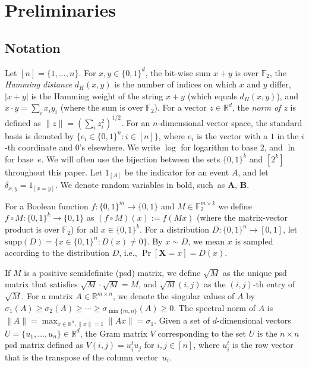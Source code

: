 \documentclass[twoside,11pt]{article}
\newcommand{\F}{\ensuremath{\mathbb{F}}}
\newcommand{\supp}{\mathrm{supp}}
\newcommand{\R}{\ensuremath{\mathbb{R}}}
\def\01{\{0,1\}}
\begin{document}
\section{Preliminaries}
\label{section:preliminaries}

\subsection{Notation}
Let $[n]=\{1,\ldots,n\}$. For $x,y\in \01^d$, the bit-wise sum $x+ y$ is over $\F_2$, the \emph{Hamming distance} $d_H(x,y)$ is the number of indices on which $x$ and $y$ differ, $|x+y|$ is the Hamming weight of the string $x+y$ (which equals $d_H(x,y)$), and $x\cdot y=\sum_i x_iy_i$ (where the sum is over $\F_2$). For a vector $z\in \R^d$,  the \emph{norm of $z$} is defined as $\|z\|=(\sum_i z_i^2)^{1/2}$. For an $n$-dimensional vector space, the standard basis is denoted by $\{e_i\in \01^n:i\in [n]\}$, where $e_i$ is the vector with a $1$ in the $i$-th coordinate and $0$'s elsewhere. We write $\log$ for logarithm to base $2$, and $\ln$ for base~$e$. We will often use the bijection between the sets $\01^k$ and $[2^k]$ throughout this paper. Let $1_{[A]}$  be the indicator for an event $A$, and let $\delta_{x,y}=1_{[x=y]}$. We denote random variables in bold, such~as $\mathbf{A}$, $\mathbf{B}$.  

For a Boolean function $f:\01^m\rightarrow \01$ and $M\in \F_2^{m\times k}$ we define $f\circ M:\01^k\rightarrow \01$ as $(f\circ M)(x):=f(Mx)$ (where the matrix-vector product is over $\F_2$) for all $x\in \01^k$. For a distribution $D:\01^n\rightarrow [0,1]$, let $\supp(D)=\{x\in \01^n:D(x)\neq 0 \}$. By $x\sim D$, we mean $x$ is sampled according to the distribution $D$, i.e., $\Pr[\mathbf{X}=x]=D(x)$.

If $M$ is a positive semidefinite (psd) matrix, we define $\sqrt{M}$ as the unique psd matrix that satisfies $\sqrt{M}\cdot \sqrt{M}=M$, and $\sqrt{M}(i,j)$ as the $(i,j)$-th entry of $\sqrt{M}$. For a matrix $A\in \R^{m\times n}$, we denote the singular values of $A$ by $\sigma_1(A)\geq \sigma_2(A)\geq \cdots \geq \sigma_{\min\{m,n\}}(A)\geq 0$. The spectral norm of $A$ is $\|A\|=\max_{x\in \R^n,\|x\|=1}\|A x\|=\sigma_1$. Given a set of $d$-dimensional vectors $U=\{u_1,\ldots,u_n\}\in \R^{d}$, the Gram matrix $V$ corresponding to the set $U$ is the $n\times n$ psd matrix defined as $V(i,j)=u_i^t u_j$ for $i,j\in [n]$, where $u_i^t$ is the row vector that is the transpose of the column vector~$u_i$.
\end{document}

